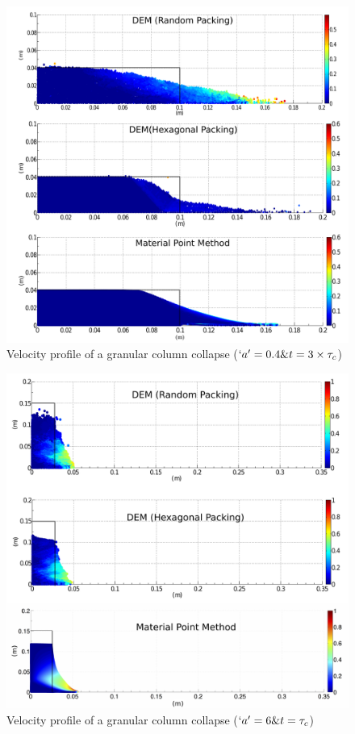 \begin{figure}[tbhp]
\centering
\includegraphics[width=\textwidth]{a04f}
\caption{Velocity profile of a granular column collapse ($`a' = 0.4 \& 
t=3\times\tau_c$)}
\label{fig:a04f}
\end{figure}

\begin{figure}[tbhp]
\centering
\includegraphics[width=\textwidth]{a6tc}
\caption{Velocity profile of a granular column collapse ($`a' = 6 \& 
t=\tau_c$)}
\label{fig:a6tc}
\end{figure}

